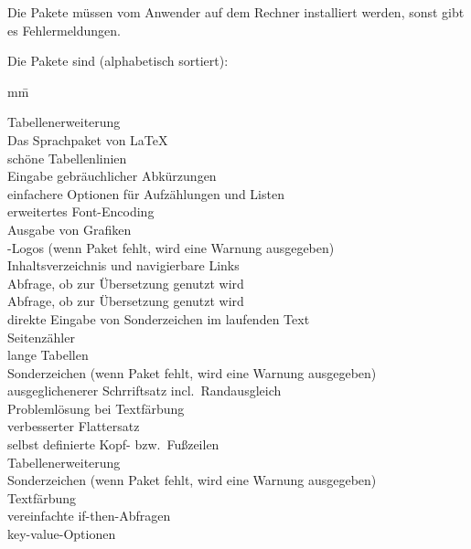 Die Pakete müssen vom Anwender auf dem Rechner installiert werden, sonst gibt es Fehlermeldungen.

Die Pakete sind (alphabetisch sortiert):
\begin{tabbing}
	mm\=\kill

	\>Tabellenerweiterung\\
	\>Das Sprachpaket von \LaTeX\\
	\>schöne Tabellenlinien\\
	\>Eingabe gebräuchlicher Abkürzungen\\
	\>einfachere Optionen für Aufzählungen und Listen\\
	\>erweitertes Font-Encoding\\
	\>Ausgabe von Grafiken\\
	\>-Logos (wenn Paket fehlt, wird eine Warnung ausgegeben)\\
	\>Inhaltsverzeichnis und navigierbare Links\\
	\>Abfrage, ob  zur Übersetzung genutzt wird\\
	\>Abfrage, ob  zur Übersetzung genutzt wird\\
	\>direkte Eingabe von Sonderzeichen im laufenden Text\\
	\>Seitenzähler\\
	\>lange Tabellen\\
	\>Sonderzeichen (wenn Paket fehlt, wird eine Warnung ausgegeben)\\
	\>ausgeglichenerer Schrriftsatz incl.\ Randausgleich\\
	\>Problemlösung bei Textfärbung\\
	\>verbesserter Flattersatz\\
	\>selbst definierte Kopf- bzw.\ Fußzeilen\\
	\>Tabellenerweiterung\\
	\>Sonderzeichen (wenn Paket fehlt, wird eine Warnung ausgegeben)\\
	\>Textfärbung\\
	\>vereinfachte if-then-Abfragen\\
	\>key-value-Optionen
\end{tabbing}


